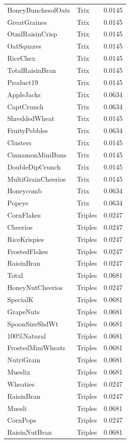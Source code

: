 \begin{table}[!htbp]
\begin{tabular}{lll}
\\
HoneyBunchesofOats & Trix & 0.0145
\\
GreatGraines & Trix & 0.0145
\\
OtmlRaisinCrisp & Trix & 0.0145
\\
OatSquares & Trix & 0.0145
\\
RiceChex & Trix & 0.0145
\\
TotalRaisinBran & Trix & 0.0145
\\
Product19 & Trix & 0.0145
\\
AppleJacks & Trix & 0.0634
\\
CaptCrunch & Trix & 0.0634
\\
ShreddedWheat & Trix & 0.0145
\\
FruityPebbles & Trix & 0.0634
\\
Clusters & Trix & 0.0145
\\
CinnamonMiniBuns & Trix & 0.0145
\\
DoubleDipCrunch & Trix & 0.0145
\\
MultiGrainCheerios & Trix & 0.0145
\\
Honeycomb & Trix & 0.0634
\\
Popeye & Trix & 0.0634
\\
CornFlakes & Triples & 0.0247
\\
Cheerios & Triples & 0.0247
\\
RiceKrispies & Triples & 0.0247
\\
FrostedFlakes & Triples & 0.0247
\\
RaisinBran & Triples & 0.0247
\\
Total & Triples & 0.0681
\\
HoneyNutCheerios & Triples & 0.0247
\\
SpecialK & Triples & 0.0681
\\
GrapeNuts & Triples & 0.0681
\\
SpoonSizeShdWt & Triples & 0.0681
\\
100\%Natural & Triples & 0.0681
\\
FrostedMiniWheats & Triples & 0.0681
\\
NutriGrain & Triples & 0.0681
\\
Mueslix & Triples & 0.0681
\\
Wheaties & Triples & 0.0247
\\
RaisinBran & Triples & 0.0247
\\
Muesli & Triples & 0.0681
\\
CornPops & Triples & 0.0247
\\
RaisinNutBran & Triples & 0.0681

\end{tabular}
\end{table}

